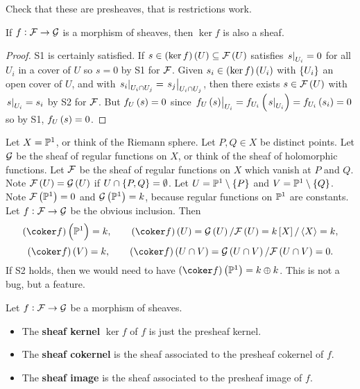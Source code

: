 \begin{exercise*}
Check that these are presheaves, that is restrictions work.
\end{exercise*}

\begin{remark}
If $ f : \mathcal{F} \to \mathcal{G} $ is a morphism of sheaves, then $ \ker f $ is also a sheaf.
\end{remark}

\begin{proof}
S1 is certainly satisfied. If $ s \in \br{\ker f}\br{U} \subseteq \FFF\br{U} $ satisfies $ \left. s \right|_{U_i} = 0 $ for all $ U_i $ in a cover of $ U $ so $ s = 0 $ by S1 for $ \mathcal{F} $. Given $ s_i \in \br{\ker f}\br{U_i} $ with $ \cbr{U_i} $ an open cover of $ U $, and with $ \left. s_i \right|_{U_i \cap U_j} = \left. s_j \right|_{U_i \cap U_j} $, then there exists $ s \in \FFF\br{U} $ with $ \left. s \right|_{U_i} = s_i $ by S2 for $ \mathcal{F} $. But $ f_U\br{s} = 0 $ since $ \eval{f_U\br{s}}_{U_i} = f_{U_i}\br{\eval{s}_{U_i}} = f_{U_i}\br{s_i} = 0 $ so by S1, $ f_U\br{s} = 0 $.
\end{proof}

\begin{example*}
Let $ X = \mathbb{P}^1 $, or think of the Riemann sphere. Let $ P, Q \in X $ be distinct points. Let $ \mathcal{G} $ be the sheaf of regular functions on $ X $, or think of the sheaf of holomorphic functions. Let $ \mathcal{F} $ be the sheaf of regular functions on $ X $ which vanish at $ P $ and $ Q $. Note $ \FFF\br{U} = \GGG\br{U} $ if $ U \cap \cbr{P, Q} = \emptyset $. Let $ U = \PP^1 \setminus \cbr{P} $ and $ V = \PP^1 \setminus \cbr{Q} $. Note $ \FFF\br{\PP^1} = 0 $ and $ \GGG\br{\PP^1} = k $, because regular functions on $ \mathbb{P}^1 $ are constants. Let $ f : \mathcal{F} \to \mathcal{G} $ be the obvious inclusion. Then
$$ \br{\coker f}\br{\PP^1} = k, \qquad \br{\coker f}\br{U} = \GGG\br{U} / \FFF\br{U} = k\sbr{X} / \abr{X} = k, $$
$$ \br{\coker f}\br{V} = k, \qquad \br{\coker f}\br{U \cap V} = \GGG\br{U \cap V} / \FFF\br{U \cap V} = 0. $$
If S2 holds, then we would need to have $ \br{\coker f}\br{\PP^1} = k \oplus k $. This is not a bug, but a feature.
\end{example*}

\begin{definition*}
Let $ f : \mathcal{F} \to \mathcal{G} $ be a morphism of sheaves.
\begin{itemize}
\item The \textbf{sheaf kernel} $ \ker f $ of $ f $ is just the presheaf kernel.
\item The \textbf{sheaf cokernel} is the sheaf associated to the presheaf cokernel of $ f $.
\item The \textbf{sheaf image} is the sheaf associated to the presheaf image of $ f $.
\end{itemize}
\end{definition*}

